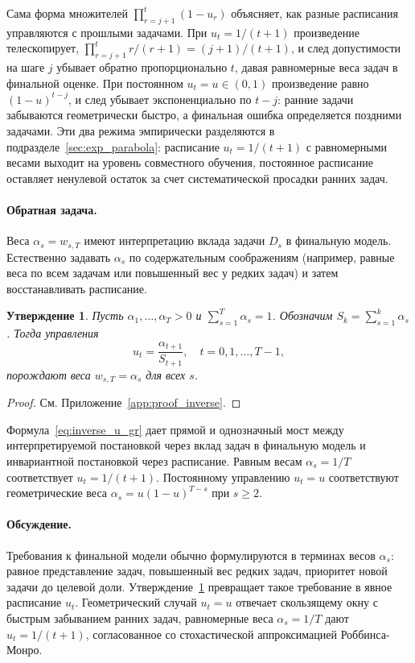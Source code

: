 \documentclass[a4paper,14pt,oneside,openany]{extarticle}
\newtheorem{proposition}{Утверждение}
\begin{document}
Сама форма множителей $\prod_{r=j+1}^{t}(1 - u_r)$ объясняет, как разные расписания управляются с прошлыми задачами. При $u_t = 1/(t+1)$ произведение телескопирует, $\prod_{r=j+1}^{t} r/(r+1) = (j+1)/(t+1)$, и след допустимости на шаге $j$ убывает обратно пропорционально $t$, давая равномерные веса задач в финальной оценке. При постоянном $u_t = u \in (0, 1)$ произведение равно $(1-u)^{t-j}$, и след убывает экспоненциально по $t - j$: ранние задачи забываются геометрически быстро, а финальная ошибка определяется поздними задачами. Эти два режима эмпирически разделяются в подразделе~\ref{sec:exp_parabola}: расписание $u_t = 1/(t+1)$ с равномерными весами выходит на уровень совместного обучения, постоянное расписание оставляет ненулевой остаток за счет систематической просадки ранних задач.

\paragraph{Обратная задача.} Веса $\alpha_s = w_{s, T}$ имеют интерпретацию вклада задачи $D_s$ в финальную модель. Естественно задавать $\alpha_s$ по содержательным соображениям (например, равные веса по всем задачам или повышенный вес у редких задач) и затем восстанавливать расписание.

\begin{proposition}\label{prop:inverse_gr}
    Пусть $\alpha_1, \ldots, \alpha_T > 0$ и $\sum_{s=1}^T \alpha_s = 1$. Обозначим $S_k = \sum_{s=1}^k \alpha_s$. Тогда управления
    \begin{equation}
        u_t = \frac{\alpha_{t+1}}{S_{t+1}}, \quad t = 0, 1, \ldots, T - 1,
        \label{eq:inverse_u_gr}
    \end{equation}
    порождают веса $w_{s, T} = \alpha_s$ для всех $s$.
\end{proposition}

\begin{proof}См. Приложение~\ref{app:proof_inverse}.\end{proof}

Формула~\eqref{eq:inverse_u_gr} дает прямой и однозначный мост между интерпретируемой постановкой через вклад задач в финальную модель и инвариантной постановкой через расписание. Равным весам $\alpha_s = 1/T$ соответствует $u_t = 1/(t+1)$. Постоянному управлению $u_t = u$ соответствуют геометрические веса $\alpha_s = u(1-u)^{T-s}$ при $s \ge 2$.

\paragraph{Обсуждение.}
Требования к финальной модели обычно формулируются в терминах весов $\alpha_s$: равное представление задач, повышенный вес редких задач, приоритет новой задачи до целевой доли. Утверждение~\ref{prop:inverse_gr} превращает такое требование в явное расписание $u_t$. Геометрический случай $u_t = u$ отвечает скользящему окну с быстрым забыванием ранних задач, равномерные веса $\alpha_s = 1/T$ дают $u_t = 1/(t+1)$, согласованное со стохастической аппроксимацией Роббинса-Монро.
\end{document}
